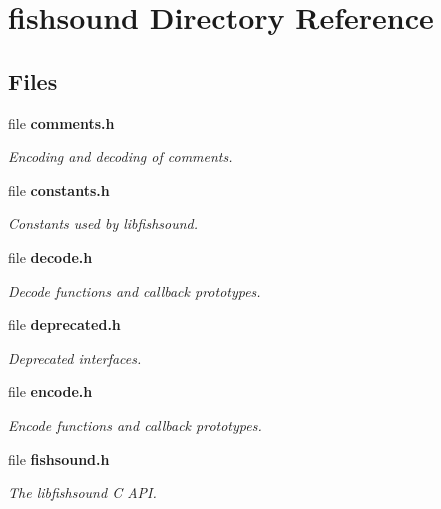 \section{fishsound Directory Reference}
\label{dir_7930a221d9c88f7293645f0ecf989605}
\subsection*{Files}
\begin{DoxyCompactItemize}
\item 
file {\bf comments.\-h}
\begin{DoxyCompactList}\small\item\em Encoding and decoding of comments. \end{DoxyCompactList}\item 
file {\bf constants.\-h}
\begin{DoxyCompactList}\small\item\em Constants used by libfishsound. \end{DoxyCompactList}\item 
file {\bf decode.\-h}
\begin{DoxyCompactList}\small\item\em Decode functions and callback prototypes. \end{DoxyCompactList}\item 
file {\bf deprecated.\-h}
\begin{DoxyCompactList}\small\item\em Deprecated interfaces. \end{DoxyCompactList}\item 
file {\bf encode.\-h}
\begin{DoxyCompactList}\small\item\em Encode functions and callback prototypes. \end{DoxyCompactList}\item 
file {\bf fishsound.\-h}
\begin{DoxyCompactList}\small\item\em The libfishsound C A\-P\-I. \end{DoxyCompactList}\end{DoxyCompactItemize}
